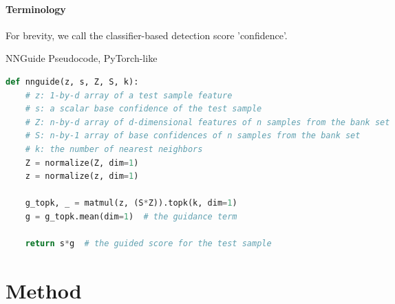 \documentclass[10pt,twocolumn,letterpaper]{article}
\begin{document}
\paragraph{Terminology}
For brevity, we call the classifier-based detection score 'confidence'.


\begin{algorithm}[t]
\caption{NNGuide Pseudocode, PyTorch-like}
\label{alg:code}
\begin{lstlisting}[language=python]
def nnguide(z, s, Z, S, k):
    # z: 1-by-d array of a test sample feature
    # s: a scalar base confidence of the test sample
    # Z: n-by-d array of d-dimensional features of n samples from the bank set
    # S: n-by-1 array of base confidences of n samples from the bank set
    # k: the number of nearest neighbors
    Z = normalize(Z, dim=1) 
    z = normalize(z, dim=1)

    g_topk, _ = matmul(z, (S*Z)).topk(k, dim=1)
    g = g_topk.mean(dim=1)  # the guidance term
    
    return s*g  # the guided score for the test sample
\end{lstlisting}
\end{algorithm}


\section{Method}
\label{sec:method}
\end{document}
